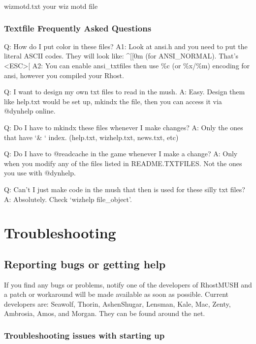 \documentclass[letterpaper,10pt,english]{sphinxmanual}
\begin{document}
\sphinxAtStartPar
wizmotd.txt            \sphinxhyphen{} your wiz motd file


\subsection{Textfile Frequently Asked Questions}
\label{\detokenize{maintenance:textfile-frequently-asked-questions}}
\sphinxAtStartPar
Q:  How do I put color in these files?
A1: Look at ansi.h and you need to put the literal ASCII codes.  They will look like: \textasciicircum{}{[}{[}0m (for ANSI\_NORMAL).  That’s \textless{}ESC\textgreater{}{[}
A2: You can enable ansi\_txtfiles then use \%c (or \%x/\%m) encoding for ansi, however you compiled your Rhost.

\sphinxAtStartPar
Q:  I want to design my own txt files to read in the mush.
A:  Easy.  Design them like help.txt would be set up, mkindx the file, then you can access it via @dynhelp online.

\sphinxAtStartPar
Q:  Do I have to mkindx these files whenever I make changes?
A:  Only the ones that have ‘\& ‘ index. (help.txt, wizhelp.txt, news.txt, etc)

\sphinxAtStartPar
Q:  Do I have to @readcache in the game whenever I make a change?
A:  Only when you modify any of the files listed in README.TXTFILES.  Not the ones you use with @dynhelp.

\sphinxAtStartPar
Q:  Can’t I just make code in the mush that then is used for these silly txt files?
A:  Absolutely.  Check ‘wizhelp file\_object’.


\chapter{Troubleshooting}
\label{\detokenize{troubleshooting:troubleshooting}}\label{\detokenize{troubleshooting::doc}}

\section{Reporting bugs or getting help}
\label{\detokenize{troubleshooting:reporting-bugs-or-getting-help}}
\sphinxAtStartPar
If you find any bugs or problems, notify one of the developers of RhostMUSH and
a patch or workaround will be made available as soon as possible.  Current
developers are:  Seawolf, Thorin, Ashen\sphinxhyphen{}Shugar, Lensman, Kale, Mac, Zenty,
Ambrosia, Amos, and Morgan.  They can be found around the net.


\subsection{Troubleshooting issues with starting up}
\label{\detokenize{troubleshooting:troubleshooting-issues-with-starting-up}}
\end{document}
